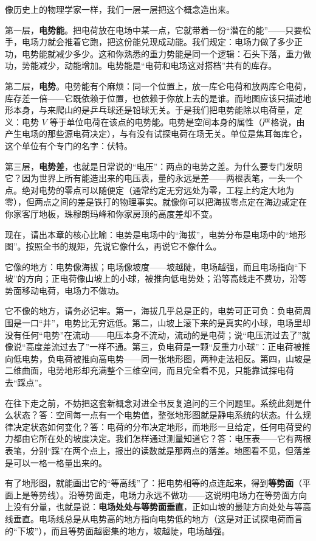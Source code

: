 
\begin{mainline}
像历史上的物理学家一样，我们一层一层把这个概念造出来。

第一层，\textbf{电势能}。把电荷放在电场中某一点，它就带着一份“潜在的能”——只要松手，电场力就会推着它跑，把这份能兑现成动能。我们规定：电场力做了多少正功，电势能就减少多少。这和你熟悉的重力势能是同一个逻辑：石头下落，重力做功，势能减少，动能增加。电势能是“电荷和电场这对搭档”共有的库存。

第二层，\textbf{电势}。电势能有个麻烦：同一个位置上，放一库仑电荷和放两库仑电荷，库存差一倍——它既依赖于位置，也依赖于你放上去的是谁。而地图应该只描述地形本身，与来爬山的是乒乓球还是铅球无关。于是我们把电势能除以电荷量，定义：电势 \(V\) 等于单位电荷在该点的电势能。电势是空间本身的属性（严格说，由产生电场的那些源电荷决定），与有没有试探电荷在场无关。单位是焦耳每库仑，这个单位有个专门的名字：伏特。

第三层，\textbf{电势差}，也就是日常说的“电压”：两点的电势之差。为什么要专门发明它？因为世界上所有能造出来的电压表，量的永远是差——两根表笔，一头一个点。绝对电势的零点可以随便定（通常约定无穷远处为零，工程上约定大地为零），但两点之间的差是铁打的物理事实。就像你可以把海拔零点定在海边或定在你家客厅地板，珠穆朗玛峰和你家房顶的高度差却不变。

现在，请出本章的核心比喻：电势是电场中的“海拔”，电势分布是电场中的“地形图”。按照全书的规矩，先说它像什么，再说它不像什么。

它像的地方：电势像海拔；电场像坡度——坡越陡，电场越强，而且电场指向“下坡”的方向；正电荷像山坡上的小球，被推向低电势处；沿等高线走不费功，沿等势面移动电荷，电场力不做功。

它不像的地方，请务必记牢。第一，海拔几乎总是正的，电势可正可负：负电荷周围是一口“井”，电势比无穷远低。第二，山坡上滚下来的是真实的小球，电场里却没有任何“电势”在流动——电压本身不流动，流动的是电荷；说“电压流过去了”就像说“高度差流过去了”一样不通。第三，负电荷是一颗“反重力小球”：正电荷被推向低电势，负电荷被推向高电势——同一张地形图，两种走法相反。第四，山坡是二维曲面，电势地形却充满整个三维空间，而且完全看不见，只能靠试探电荷去“踩点”。

在往下走之前，不妨把这套新概念对进全书反复追问的三个问题里。系统此刻是什么状态？答：空间每一点有一个电势值，整张地形图就是静电系统的状态。什么规律决定状态如何变化？答：电荷的分布决定地形，而地形一旦给定，任何电荷受的力都由它所在处的坡度决定。我们怎样通过测量知道它？答：电压表——它有两根表笔，分别“踩”在两个点上，报出的读数就是那两点的落差。地图看不见，但落差是可以一格一格量出来的。

有了地形图，就能画出它的“等高线”了：把电势相等的点连起来，得到\textbf{等势面}（平面上是等势线）。沿等势面走，电场力永远不做功——这说明电场力在等势面方向上没有分量，也就是说：\textbf{电场处处与等势面垂直}，正如山坡的最陡方向处处与等高线垂直。电场线总是从电势高的地方指向电势低的地方（这是对正试探电荷而言的“下坡”），而且等势面越密集的地方，坡越陡，电场越强。
\end{mainline}

